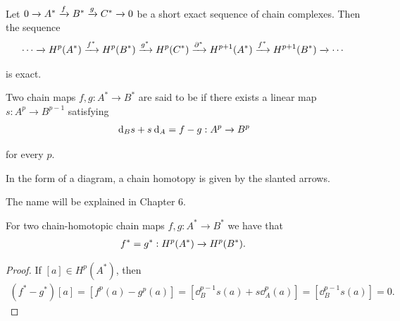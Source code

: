 \begin{theorem}\label{theorem:4-9}
Let $0\xra[]A^*\xra[f]B^*\xra[g]C^*\xra[]0$ be a short exact sequence of chain complexes. Then the sequence
\begin{align*}
  \cdots\xra[]H^p(A^*)\xra[f^*]H^p(B^*)\xra[g^*]H^p(C^*)\xra[\partial^*]H^{p+1}(A^*)\xra[f^*]H^{p+1}(B^*)\xra[] \cdots
\end{align*}

is exact.
\end{theorem}


\begin{definition}\label{definition:4-10}
  Two chain maps $f, g:A^*\to B^*$ are said to be  if there exists a linear map
$s:A^p\to B^{p-1}$ satisfying
\begin{align*}
  \dd_{B}s + s\dd_A = f - g: A^p\xra[]B^p
\end{align*}

for every $p$.
\end{definition}

In the form of a diagram, a chain homotopy is given by the slanted arrows.
\begin{center}
\end{center}


The name  will be explained in Chapter 6.


\begin{lemma}\label{lemma:4-11}
  For two chain-homotopic chain maps $f,g:A^*\to B^*$ we have that
  \begin{align*}
    f^* = g^*: H^p(A^*)\xra[]H^p(B^*).
  \end{align*}
\end{lemma}

\begin{proof}
  If $[a]\in H^p(A^*)$, then 
  \begin{align*}
    (f^* - g^*)[a] = [f^p(a) - g^p(a)] = [\dd_B^{p-1}s(a) + s\dd^p_A(a)] 
    = [\dd^{p-1}_Bs(a)] 
    = 0.
  \end{align*}
\end{proof}


